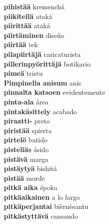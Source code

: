 \textbf{ pihistää  } kremenchá \\
\textbf{ piikitellä  } ataká \\
\textbf{ piirittää  } ataká \\
\textbf{ piirtäminen  } diseño \\
\textbf{ piirtää  } tek \\
\textbf{ pilapiirtäjä  } caricaturista \\
\textbf{ pillerinpyörittäjä  } botikario \\
\textbf{ pimeä  } tristu \\
\textbf{ Pimpinella anisum  } anis \\
\textbf{ pinnalta katsoen  } evidentemente \\
\textbf{ pinta-ala  } área \\
\textbf{ pintakäsittely  } acabado \\
\textbf{ piraatti-  } preto \\
\textbf{ piristää  } spierta \\
\textbf{ pirtelö  } batido \\
\textbf{ pisteliäs  } ásido \\
\textbf{ pistävä  } marga \\
\textbf{ pistäytyä  } bishitá \\
\textbf{ pistää  } morde \\
\textbf{ pitkä aika  } époka \\
\textbf{ pitkäaikainen  } a lo largo \\
\textbf{ pitkäperjantai  } bièrnèsantu \\
\textbf{ pitkästyttävä  } cansando \\
